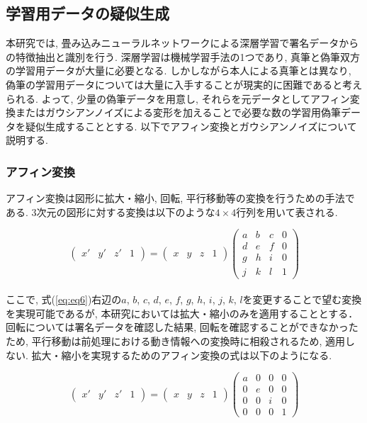 \subsection{学習用データの疑似生成}

本研究では, 畳み込みニューラルネットワークによる深層学習で署名データからの特徴抽出と識別を行う. 深層学習は機械学習手法の1つであり, 真筆と偽筆双方の学習用データが大量に必要となる. しかしながら本人による真筆とは異なり, 偽筆の学習用データについては大量に入手することが現実的に困難であると考えられる. よって, 少量の偽筆データを用意し, それらを元データとしてアフィン変換またはガウシアンノイズによる変形を加えることで必要な数の学習用偽筆データを疑似生成することとする. 以下でアフィン変換とガウシアンノイズについて説明する.\\

\subsubsection{アフィン変換}

アフィン変換は図形に拡大・縮小, 回転, 平行移動等の変換を行うための手法である. 3次元の図形に対する変換は以下のような$4\times4$行列を用いて表される.

\begin{equation}
  \begin{pmatrix} 
    x' &y' &z' &1
  \end{pmatrix} 
  =
  \begin{pmatrix} 
    x &y &z &1
  \end{pmatrix} 
  \begin{pmatrix} 
    a &b &c &0\\
    d &e &f &0\\
    g &h &i &0\\
    j &k &l &1
  \end{pmatrix} 
  \label{eq:eq6}
\end{equation}\\

\noindent
ここで, 式(\ref{eq:eq6})右辺の$a$, $b$, $c$, $d$, $e$, $f$, $g$, $h$, $i$, $j$, $k$, $l$を変更することで望む変換を実現可能であるが, 本研究においては拡大・縮小のみを適用することとする．回転については署名データを確認した結果, 回転を確認することができなかったため, 平行移動は前処理における動き情報への変換時に相殺されるため, 適用しない. 拡大・縮小を実現するためのアフィン変換の式は以下のようになる.

\begin{equation}
  \begin{pmatrix} 
    x' &y' &z' &1
  \end{pmatrix} 
  =
  \begin{pmatrix} 
    x &y &z &1
  \end{pmatrix} 
  \begin{pmatrix} 
    a &0 &0 &0\\
    0 &e &0 &0\\
    0 &0 &i &0\\
    0 &0 &0 &1
  \end{pmatrix} 
  \label{eq:eq7}
\end{equation}\\

